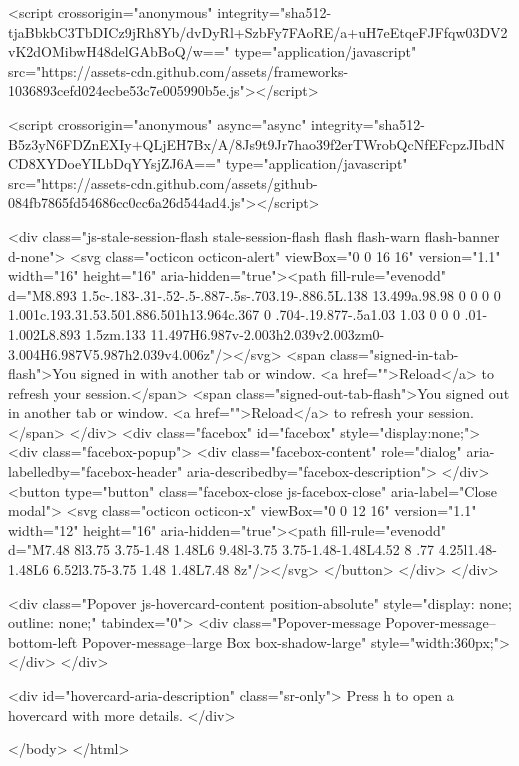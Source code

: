     
    <script crossorigin="anonymous" integrity="sha512-tjaBbkbC3TbDICz9jRh8Yb/dvDyRl+SzbFy7FAoRE/a+uH7eEtqeFJFfqw03DV2vK2dOMibwH48delGAbBoQ/w==" type="application/javascript" src="https://assets-cdn.github.com/assets/frameworks-1036893cefd024ecbe53c7e005990b5e.js"></script>
    
    <script crossorigin="anonymous" async="async" integrity="sha512-B5z3yN6FDZnEXIy+QLjEH7Bx/A/8Js9t9Jr7hao39f2erTWrobQcNfEFcpzJIbdNCD8XYDoeYILbDqYYsjZJ6A==" type="application/javascript" src="https://assets-cdn.github.com/assets/github-084fb7865fd54686cc0cc6a26d544ad4.js"></script>
    
    
    
  <div class="js-stale-session-flash stale-session-flash flash flash-warn flash-banner d-none">
    <svg class="octicon octicon-alert" viewBox="0 0 16 16" version="1.1" width="16" height="16" aria-hidden="true"><path fill-rule="evenodd" d="M8.893 1.5c-.183-.31-.52-.5-.887-.5s-.703.19-.886.5L.138 13.499a.98.98 0 0 0 0 1.001c.193.31.53.501.886.501h13.964c.367 0 .704-.19.877-.5a1.03 1.03 0 0 0 .01-1.002L8.893 1.5zm.133 11.497H6.987v-2.003h2.039v2.003zm0-3.004H6.987V5.987h2.039v4.006z"/></svg>
    <span class="signed-in-tab-flash">You signed in with another tab or window. <a href="">Reload</a> to refresh your session.</span>
    <span class="signed-out-tab-flash">You signed out in another tab or window. <a href="">Reload</a> to refresh your session.</span>
  </div>
  <div class="facebox" id="facebox" style="display:none;">
  <div class="facebox-popup">
    <div class="facebox-content" role="dialog" aria-labelledby="facebox-header" aria-describedby="facebox-description">
    </div>
    <button type="button" class="facebox-close js-facebox-close" aria-label="Close modal">
      <svg class="octicon octicon-x" viewBox="0 0 12 16" version="1.1" width="12" height="16" aria-hidden="true"><path fill-rule="evenodd" d="M7.48 8l3.75 3.75-1.48 1.48L6 9.48l-3.75 3.75-1.48-1.48L4.52 8 .77 4.25l1.48-1.48L6 6.52l3.75-3.75 1.48 1.48L7.48 8z"/></svg>
    </button>
  </div>
</div>

  <div class="Popover js-hovercard-content position-absolute" style="display: none; outline: none;" tabindex="0">
  <div class="Popover-message Popover-message--bottom-left Popover-message--large Box box-shadow-large" style="width:360px;">
  </div>
</div>

<div id="hovercard-aria-description" class="sr-only">
  Press h to open a hovercard with more details.
</div>


  </body>
</html>


